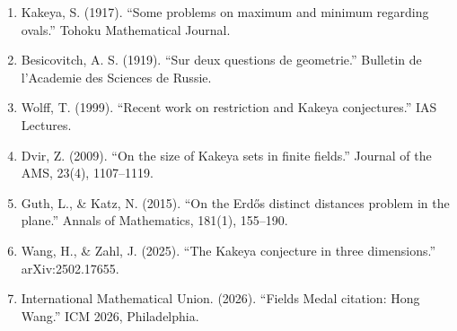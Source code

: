 \begin{enumerate}
\item Kakeya, S. (1917). ``Some problems on maximum and minimum regarding ovals.'' Tohoku Mathematical Journal.
\item Besicovitch, A. S. (1919). ``Sur deux questions de geometrie.'' Bulletin de l'Academie des Sciences de Russie.
\item Wolff, T. (1999). ``Recent work on restriction and Kakeya conjectures.'' IAS Lectures.
\item Dvir, Z. (2009). ``On the size of Kakeya sets in finite fields.'' Journal of the AMS, 23(4), 1107--1119.
\item Guth, L., \& Katz, N. (2015). ``On the Erd\H{o}s distinct distances problem in the plane.'' Annals of Mathematics, 181(1), 155--190.
\item Wang, H., \& Zahl, J. (2025). ``The Kakeya conjecture in three dimensions.'' arXiv:2502.17655.
\item International Mathematical Union. (2026). ``Fields Medal citation: Hong Wang.'' ICM 2026, Philadelphia.
\end{enumerate}
